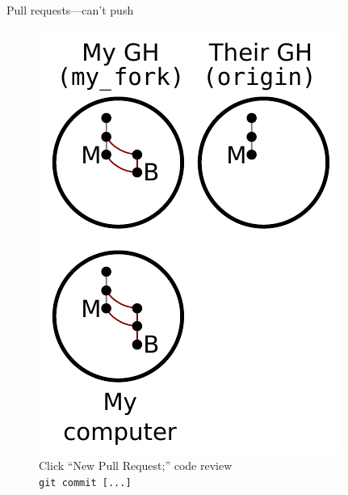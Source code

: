 \begin{frame}{Pull requests---can't push}
  \begin{figure}
    \includegraphics{fork_011.pdf}
    \\ Click ``New Pull Request;'' code review
    \\ \texttt{git commit [...]}
  \end{figure}
\end{frame}

